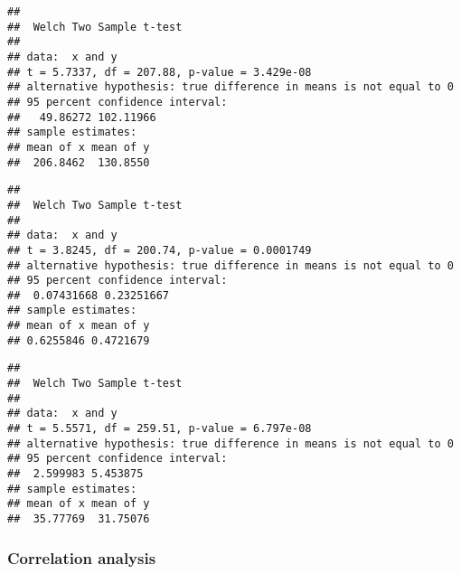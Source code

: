 \documentclass[
]{article}
\newenvironment{Shaded}{\begin{snugshade}}{\end{snugshade}}
\newcommand{\AttributeTok}[1]{\textcolor[rgb]{0.77,0.63,0.00}{#1}}
\newcommand{\DecValTok}[1]{\textcolor[rgb]{0.00,0.00,0.81}{#1}}
\newcommand{\FunctionTok}[1]{\textcolor[rgb]{0.00,0.00,0.00}{#1}}
\newcommand{\NormalTok}[1]{#1}
\newcommand{\OtherTok}[1]{\textcolor[rgb]{0.56,0.35,0.01}{#1}}
\newcommand{\SpecialCharTok}[1]{\textcolor[rgb]{0.00,0.00,0.00}{#1}}
\newcommand{\StringTok}[1]{\textcolor[rgb]{0.31,0.60,0.02}{#1}}
\begin{document}
\begin{verbatim}
## 
##  Welch Two Sample t-test
## 
## data:  x and y
## t = 5.7337, df = 207.88, p-value = 3.429e-08
## alternative hypothesis: true difference in means is not equal to 0
## 95 percent confidence interval:
##   49.86272 102.11966
## sample estimates:
## mean of x mean of y 
##  206.8462  130.8550
\end{verbatim}

\begin{Shaded}
\end{Shaded}

\begin{verbatim}
## 
##  Welch Two Sample t-test
## 
## data:  x and y
## t = 3.8245, df = 200.74, p-value = 0.0001749
## alternative hypothesis: true difference in means is not equal to 0
## 95 percent confidence interval:
##  0.07431668 0.23251667
## sample estimates:
## mean of x mean of y 
## 0.6255846 0.4721679
\end{verbatim}

\begin{Shaded}
\end{Shaded}

\begin{verbatim}
## 
##  Welch Two Sample t-test
## 
## data:  x and y
## t = 5.5571, df = 259.51, p-value = 6.797e-08
## alternative hypothesis: true difference in means is not equal to 0
## 95 percent confidence interval:
##  2.599983 5.453875
## sample estimates:
## mean of x mean of y 
##  35.77769  31.75076
\end{verbatim}

\hypertarget{correlation-analysis}{%
\subsubsection{Correlation analysis}\label{correlation-analysis}}

\begin{Shaded}
\end{Shaded}
\end{document}
